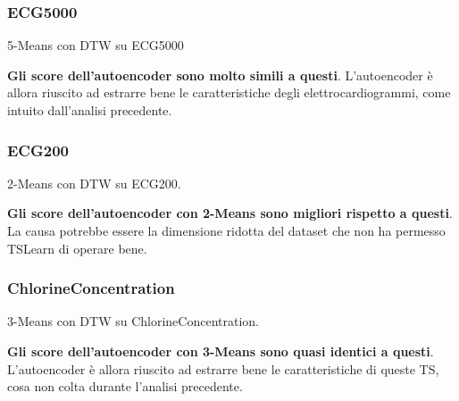 \subsubsection{ECG5000}
\begin{center}
	\begin{table}[H]
		\centering
		\caption{5-Means con DTW su ECG5000}
	\end{table}
\end{center}
\textbf{Gli score dell'autoencoder sono molto simili a questi}. L'autoencoder è allora riuscito ad estrarre bene le caratteristiche degli elettrocardiogrammi, come intuito dall'analisi precedente.

\subsubsection{ECG200}
\begin{center}
	\begin{table}[H]
		\centering
		\caption{2-Means con DTW su ECG200.}
	\end{table}
\end{center}
\textbf{Gli score dell'autoencoder con 2-Means sono migliori rispetto a questi}. La causa potrebbe essere la dimensione ridotta del dataset che non ha permesso TSLearn di operare bene.

\subsubsection{ChlorineConcentration}
\begin{center}
	\begin{table}[H]
		\centering
		\caption{3-Means con DTW su ChlorineConcentration.}
	\end{table}
\end{center}
\textbf{Gli score dell'autoencoder con 3-Means sono quasi identici a questi}. L'autoencoder è allora riuscito ad estrarre bene le caratteristiche di queste TS, cosa non colta durante l'analisi precedente.

